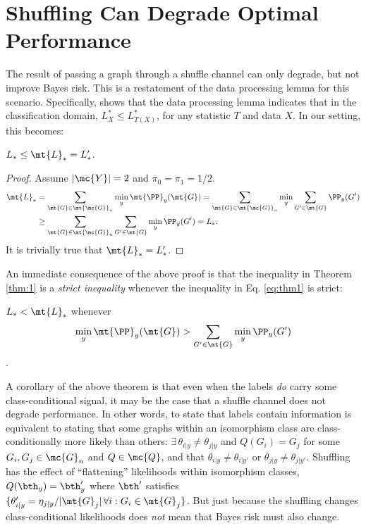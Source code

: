 \documentclass[10pt,journal,cspaper,compsoc]{IEEEtran}
\newcommand{\Qs}{Q}
\begin{document}

\section{Shuffling Can Degrade Optimal Performance} %
\label{sec:shuffle}

The result of passing a graph through a shuffle channel can only degrade, but not improve Bayes risk.  This is a restatement of the data processing lemma for this scenario. Specifically, \cite{DEV96} shows that the data processing lemma indicates that in the classification domain, $L^*_X \leq L^*_{T(X)}$, for any statistic $T$ and data $X$.  In our setting, this becomes:

\begin{thm} \label{thm:1}
$L_* \leq \mt{L}_*=L_*'$.
\end{thm}

\begin{proof}
	Assume $|\mc{Y}|=2$ and $\pi_0=\pi_1=1/2$.  
\begin{align} \label{eq:thm1}
	\mt{L}_*&=\sum_{\mt{G} \in \mt{\mc{G}}_n} \min_y \mt{\PP}_{y}(\mt{G})
	=\sum_{\mt{G} \in \mt{\mc{G}}_n} \min_y \sum_{G' \in \mt{G}}\PP_y(G')
	\nonumber \\& \geq \sum_{\mt{G} \in \mt{\mc{G}}_n}\sum_{G' \in \mt{G}}\min_y\PP_y(G')=L_*.
\end{align}
It is trivially true that $\mt{L}_*=L_*'$.
\end{proof}



An immediate consequence of the above proof is that the inequality in Theorem \ref{thm:1} is a \emph{strict inequality} whenever the inequality in Eq. \ref{eq:thm1} is strict:

\begin{thm}
	$L_* < \mt{L}_*$ whenever $$\min_y \mt{\PP}_{y}(\mt{G}) > \sum_{G' \in \mt{G}}\min_y\PP_y(G')$$.
\end{thm}

A corollary of the above theorem is that even when the labels \emph{do} carry some class-conditional signal, it may be the case that a shuffle channel does not degrade performance.  In other words, to state that labels contain information is equivalent to stating that some graphs within an isomorphism class are class-conditionally more likely than others: $\exists \, \theta_{i|y} \neq \theta_{j|y}$ and $\Qs(G_i)=G_j$ for some $G_i,G_j \in \mc{G}_n$ and $\Qs \in \mc{Q}$, and that $\theta_{i|y}\neq \theta_{i|y'}$ or $\theta_{j|y}\neq \theta_{j|y'}$.  Shuffling has the effect of ``flattening'' likelihoods within isomorphism classes, $\Qs(\bth_y)=\bth_y'$ where $\bth'$ satisfies $\{\theta_{i|y}'=\eta_{j|y}/|\mt{G}_j| \, \forall i : G_i \in \mt{G}_j\}$.  But just because the shuffling changes class-conditional likelihoods does \emph{not} mean that Bayes risk must also change.
\end{document}
